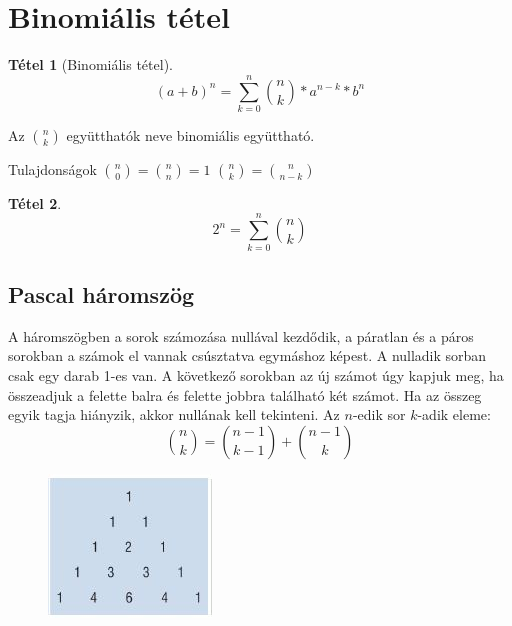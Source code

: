 \documentclass[twoside,12pt]{report}
\newtheorem{theorem}{Tétel}[section]
\theoremstyle{definition}
\begin{document}
\section{Binomiális tétel}
	\begin{theorem}[Binomiális tétel]
		\begin{equation*}
			(a+b)^n=\sum_{k=0}^{n}\binom{n}{k}*a^{n-k}*b^n
		\end{equation*}
	\end{theorem}
	Az $\binom{n}{k}$ együtthatók neve binomiális együttható.
	\begin{outline}
		\1 Tulajdonságok
			\2 $\binom{n}{0}=\binom{n}{n}=1$
			\2 $\binom{n}{k}=\binom{n}{n-k}$
	\end{outline}
	\begin{theorem}
		\begin{equation*}
			2^n=\sum_{k=0}^{n}\binom{n}{k}
		\end{equation*}
	\end{theorem}
	\subsection{Pascal háromszög}
	A háromszögben a sorok számozása nullával kezdődik, a páratlan és a páros sorokban a számok el
	vannak csúsztatva egymáshoz képest. A nulladik sorban csak egy darab 1-es van. A következő sorokban az új számot úgy kapjuk meg, ha összeadjuk a felette balra és felette jobbra található két számot. Ha az összeg egyik tagja hiányzik, akkor nullának kell tekinteni. Az $n$-edik sor $k$-adik eleme:
	\begin{equation*}
		\binom{n}{k}=\binom{n-1}{k-1}+\binom{n-1}{k}
	\end{equation*}
	\begin{figure}[H]
		\centering
		\includegraphics[width=.3\linewidth]{Pascal}
	\end{figure}
\end{document}
